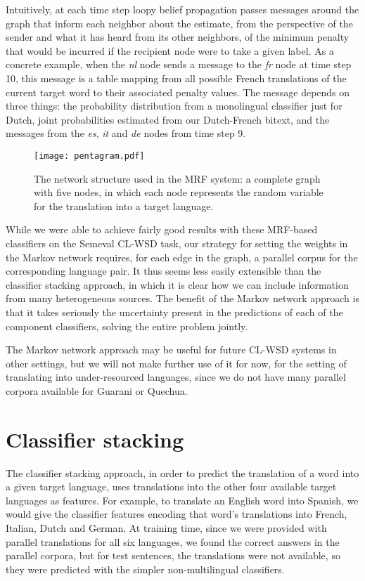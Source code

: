 Intuitively, at each time step loopy belief propagation passes messages around
the graph that inform each neighbor about the estimate, from the perspective of
the sender and what it has heard from its other neighbors, of the minimum
penalty that would be incurred if the recipient node were to take a given
label. As a concrete example, when the \emph{nl} node sends a message to the
\emph{fr} node at time step 10, this message is a table mapping from all
possible French translations of the current target word to their associated
penalty values. The message depends on three things: the probability
distribution from a monolingual classifier just for Dutch, joint probabilities
estimated from our Dutch-French bitext, and the messages from the \emph{es},
\emph{it} and \emph{de} nodes from time step 9.

\begin{figure}
  \begin{center}
  \texttt{[image: pentagram.pdf]}
  \end{center}
  \caption{The network structure used in the MRF system: a complete graph with
  five nodes, in which each node represents the random variable for the
  translation into a target language.}
  \label{fig:pentagram}
\end{figure}


While we were able to achieve fairly good results with these MRF-based
classifiers on the Semeval CL-WSD task, our strategy for setting the weights in
the Markov network requires, for each edge in the graph, a parallel corpus for
the corresponding language pair.
It thus seems less easily extensible than the classifier stacking approach, in
which it is clear how we can include information from many heterogeneous
sources. The benefit of the Markov network approach is that it takes seriously
the uncertainty present in the predictions of each of the component
classifiers, solving the entire problem jointly.

The Markov network approach may be useful for future CL-WSD systems in other
settings, but we will not make further use of it for now, for the setting of
translating into under-resourced languages, since we do not have many parallel
corpora available for Guarani or Quechua.

\section{Classifier stacking}
The classifier stacking approach, in order to predict the translation of a word
into a given target language, uses translations into the other four available
target languages as features.
For example, to translate an English word into Spanish, we would give the
classifier features encoding that word's translations into French, Italian,
Dutch and German.
At training time, since we were provided with parallel translations for all six
languages, we found the correct answers in the parallel corpora, but for test
sentences, the translations were not available, so they were predicted with the
simpler non-multilingual classifiers.


